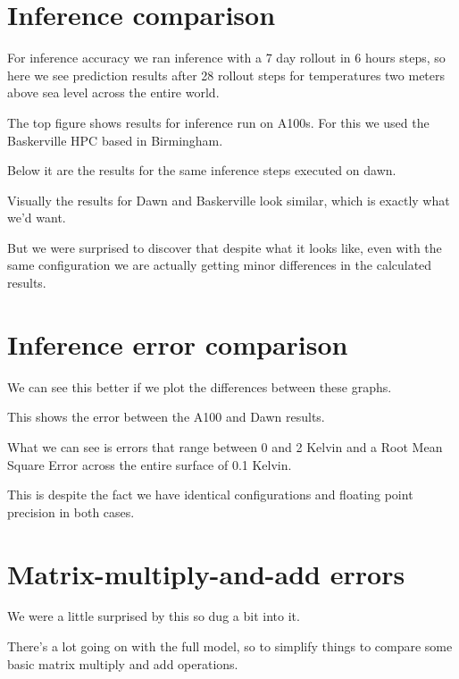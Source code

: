 \documentclass{article}
\begin{document}

\section{Inference comparison}

For inference accuracy we ran inference with a 7 day rollout in 6 hours steps, so here we see prediction results after 28 rollout steps for temperatures two meters above sea level across the entire world.

The top figure shows results for inference run on A100s. For this we used the Baskerville HPC based in Birmingham.

Below it are the results for the same inference steps executed on dawn.

Visually the results for Dawn and Baskerville look similar, which is exactly what we'd want.

But we were surprised to discover that despite what it looks like, even with the same configuration we are actually getting minor differences in the calculated results.


\section{Inference error comparison}

We can see this better if we plot the differences between these graphs.

This shows the error between the A100 and Dawn results.

What we can see is errors that range between 0 and 2 Kelvin and a Root Mean Square Error across the entire surface of 0.1 Kelvin.

This is despite the fact we have identical configurations and floating point precision in both cases.


\section{Matrix-multiply-and-add errors}

We were a little surprised by this so dug a bit into it.

There's a lot going on with the full model, so to simplify things to compare some basic matrix multiply and add operations.
\end{document}
